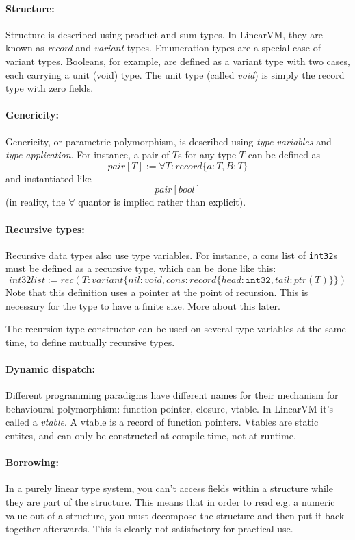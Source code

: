 \documentclass[a4paper]{report}
\begin{document}
\paragraph{Structure:}
Structure is described using product and sum types. In LinearVM, they
are known as \emph{record} and \emph{variant} types.
Enumeration types are a special case of variant types.
Booleans, for example, are defined as a variant type with two cases,
each carrying a unit (void) type.
The unit type (called \emph{void}) is simply the record type with zero fields.

\paragraph{Genericity:}
Genericity, or parametric polymorphism, is described using
\emph{type variables} and \emph{type application}.
For instance, a pair of $T$s for any type $T$ can be defined as
$$pair[T] := \forall T:record\{a:T, B:T\}$$
and instantiated like
$$pair[bool]$$
(in reality, the $\forall$ quantor is implied rather than explicit).

\paragraph{Recursive types:}
Recursive data types also use type variables.
For instance, a cons list of \texttt{int32}s must be defined as a recursive type,
which can be done like this:
$$
int32list := rec(T:variant\{nil:void, cons:record\{head:\mathtt{int32}, tail:ptr(T)\}\})
$$
Note that this definition uses a pointer at the point of
recursion. This is necessary for the type to have a finite size. More
about this later.

The recursion type constructor can be used on several type variables at the same time, to define mutually recursive types.

\paragraph{Dynamic dispatch:}
Different programming paradigms have different names for their mechanism
for behavioural polymorphism: function pointer, closure, vtable.
In LinearVM it's called a \emph{vtable}.
A vtable is a record of function pointers. Vtables are static entites, and
can only be constructed at compile time, not at runtime.

\paragraph{Borrowing:}
In a purely linear type system, you can't access fields within a
structure while they are part of the structure. This means that in
order to read e.g.  a numeric value out of a structure, you must
decompose the structure and then put it back together afterwards.
This is clearly not satisfactory for practical use.
\end{document}

